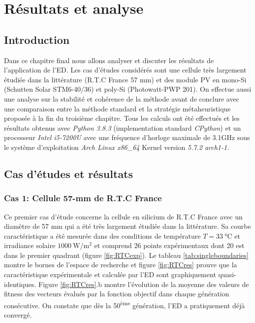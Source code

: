 \chapter{Résultats et analyse}

\section{Introduction}
Dans ce chapitre final nous allons analyser et discuter les résultats de l'application de l'ED. Les cas d'études considérés sont une cellule très largement étudiée dans la littérature (R.T.C France 57 mm) et des module PV en mono-Si (Schutten Solar STM6-40/36) et poly-Si (Photowatt-PWP 201). On effectue aussi une analyse sur la stabilité et cohérence de la méthode avant de conclure avec une comparaison entre la méthode standard et la stratégie métaheuristique proposée à la fin du troisième chapitre. Tous les calculs ont été effectués et les résultats obtenus avec \textit{Python 3.8.3} (implementation standard \textit{CPython}) et un processeur \textit{Intel i5-7200U} avec une fréquence d'horloge maximale de 3.1\si{\giga\hertz} sous le système d'exploitation \textit{Arch Linux x86\_64} Kernel version \textit{5.7.2 arch1-1.}

\section{Cas d'études et résultats}
\subsection{Cas 1: Cellule 57-mm de R.T.C France}

Ce premier cas d'étude concerne la cellule en silicium de R.T.C France avec un diamètre de 57 mm qui a été très largement étudiée dans la littérature. Sa courbe caractéristique a été mesurée dans des conditions de température $T = \SI{33}{\celsius}$ et irradiance solaire $\SI{1000}{\watt\per\square\meter}$ et comprend 26 points expérimentaux dont 20 est dans le premier quadrant (figure \ref{fig:RTCexp}). Le tableau \ref{tab:singleboundaries} montre le bornes de l'espace de recherche et figure \ref{fig:RTCres} prouve que la caractéristique expérimentale et calculée par l'ED sont graphiquement quasi-identiques. Figure \ref{fig:RTCres}.b montre l'évolution de la moyenne des valeurs de fitness des vecteurs évalués par la fonction objectif dans chaque génération consécutive. On constate que dès la 50\textsuperscript{ème} génération, l'ED a pratiquement déjà convergé.

